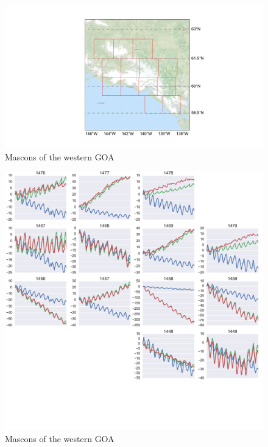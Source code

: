 \documentclass[review]{igs}
\begin{document}
\begin{figure}
\noindent\includegraphics[width=178mm]{figures/easternMap} \centering \caption{Mascons of the western GOA} \label{fig:summer}
\end{figure}

\begin{figure}
\noindent\includegraphics[width=178mm]{figures/easternPlot} \centering \caption{Mascons of the western GOA} \label{fig:summer}
\end{figure}
\end{document}
